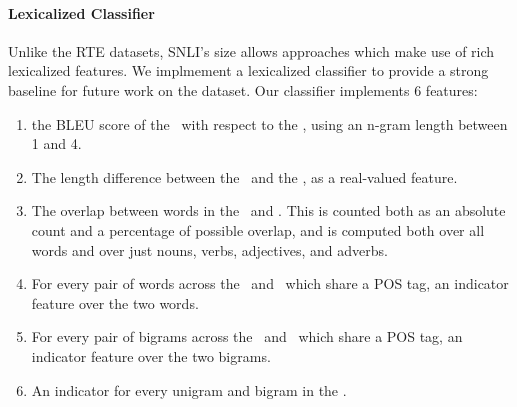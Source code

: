 \paragraph{Lexicalized Classifier}
Unlike the RTE datasets, SNLI's size allows approaches which make use of
  rich lexicalized features.
We implmement a lexicalized classifier to provide a strong baseline for future work
  on the dataset.
Our classifier implements 6 features:
\begin{enumerate}  %
\setlength\itemsep{0em}
  \item the BLEU score of the \hypothesis\ with respect
  to the \premise, using an n-gram length between 1 and 4.

  \item The length difference between the \hypothesis\ and the \premise, as a real-valued
  feature.

  \item The overlap between words in the \premise\ and \hypothesis. This is counted
  both as an absolute count and a percentage of possible overlap, and is computed
  both over all words and over just nouns, verbs, adjectives, and adverbs.

  \item For every pair of words across the \premise\ and \hypothesis\ which share a 
  POS tag, an indicator feature over the two words.
  
  \item For every pair of bigrams across the \premise\ and \hypothesis\ which share a 
  POS tag, an indicator feature over the two bigrams.
  
  \item An indicator for every unigram and bigram in the \hypothesis.
\end{enumerate}

%
%
\def\t#1{\small{#1}}
\def\b#1{\t{\textbf{#1}}}
\def\colspaceS{2.0mm}
\def\colspaceM{3.0mm}
\def\colspaceL{4.0mm}


